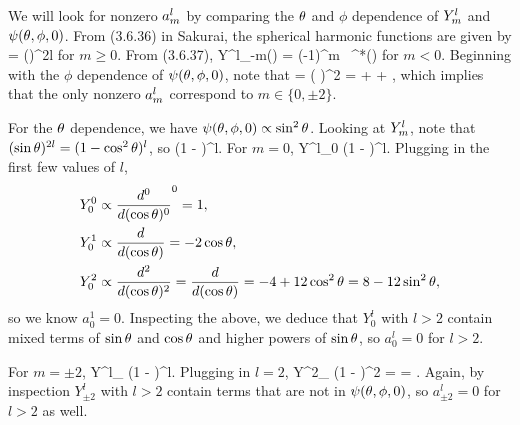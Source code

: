\begin{solution}
	We will look for nonzero $a^l_m$ by comparing the $\theta$ and $\phi$ dependence of $Y^l_m$ and $\psi(\theta, \phi, 0)$.  From (3.6.36) in Sakurai, the spherical harmonic functions are given by
	\beq
		\Ylmtp =    \dv[l - m]{}{(\cost)} (\sint)^{2l}
	\eeq
	for $m \geq 0$.  From (3.6.37),
	\beq
		Y^l_{-m}(\tp) = (-1)^m \, {\Ylm}^*(\tp)
	\eeq
	for $m < 0$.  Beginning with the $\phi$ dependence of $\psi(\theta, \phi, 0)$, note that
	\beqn \label{cos}
		\psitpo \propto \coswp = \left(  \right)^2 =  +  + ,
	\eeqn
	which implies that the only nonzero $a^l_m$ correspond to $m \in \{ 0, \pm 2 \}$.
	
	For the $\theta$ dependence, we have $\psi(\theta, \phi, 0) \propto \sin^2{\theta}$.  Looking at $Y^l_m$, note that $(\sin{\theta})^{2l} = (1 - \cos^2{\theta})^l$, so
	\beq
		\Ylm \propto {} \dv[l - m]{}{(\cost)} (1 - \coswt)^l.
	\eeq
	For $m = 0$,
	\beq
		Y^l_0 \propto \dv[l]{}{(\cost)} (1 - \coswt)^l.
	\eeq
	Plugging in the first few values of $l$,
	\begin{align*}
		Y^0_0 &\propto \dv[0]{}{(\cos{\theta})} (1 - \cos^2{\theta})^0 = 1, \\
		Y^1_0 &\propto \dv{}{(\cos{\theta})} (1 - \cos^2{\theta}) = -2\cos{\theta}, \\
		Y^2_0 &\propto \dv[2]{}{(\cos{\theta})} (1 - 2\cos^2{\theta} + \cos^4{\theta}) = \dv{}{(\cos{\theta})} (-4 \cos{\theta} + 4 \cos^3{\theta}) = -4 + 12 \cos^2{\theta} = 8 - 12 \sin^2{\theta},
	\end{align*}
	so we know $a^1_0 = 0$.  Inspecting the above, we deduce that $Y^l_0$ with $l > 2$ contain mixed terms of $\sin{\theta}$ and $\cos{\theta}$ and higher powers of $\sin{\theta}$, so $a^l_0 = 0$ for $l > 2$.
	
	For $m = \pm 2$,
	\beq
		Y^l_{} \propto {} \sinwt \dv[l -2]{}{(\cost)} (1 - \coswt)^l.
	\eeq
	Plugging in $l = 2$,
	\beq
		Y^2_{} \propto {} \dv[0]{}{(\cost)} (1 - \coswt)^2 =  = \sinwt.
	\eeq
	Again, by inspection $Y^l_{\pm2}$ with $l > 2$ contain terms that are not in $\psi(\theta, \phi, 0)$, so $a^l_{\pm2} = 0$ for $l > 2$ as well.
	

\end{solution}
